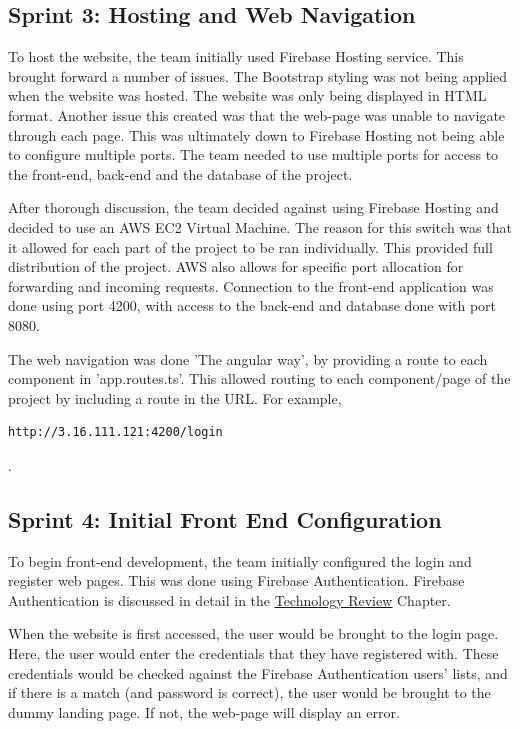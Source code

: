 \subsection{Sprint 3: Hosting and Web Navigation}
\label{sec:MethodologySprint3}
To host the website, the team initially used Firebase Hosting service. This brought forward a number of issues. The Bootstrap styling was not being applied when the website was hosted. The website was only being displayed in HTML format. Another issue this created was that the web-page was unable to navigate through each page. This was ultimately down to Firebase Hosting not being able to configure multiple ports. The team needed to use multiple ports for access to the front-end, back-end and the database of the project.

\bigskip

After thorough discussion, the team decided against using Firebase Hosting and decided to use an AWS EC2 Virtual Machine. The reason for this switch was that it allowed for each part of the project to be ran individually. This provided full distribution of the project. AWS also allows for specific port allocation for forwarding and incoming requests. Connection to the front-end application was done using port 4200, with access to the back-end and database done with port 8080.

\bigskip

The web navigation was done 'The angular way', by providing a route to each component in 'app.routes.ts'. This allowed routing to each component/page of the project by including a route in the URL. For example, \begin{verbatim}http://3.16.111.121:4200/login\end{verbatim}.
\subsection{Sprint 4: Initial Front End Configuration}
\label{sec:MethodologySprint4}
To begin front-end development, the team initially configured the login and register web pages. This was done using Firebase Authentication. Firebase Authentication is discussed in detail in the \hyperref[sec:TechnologyReview]{\underline{Technology Review}} Chapter.

\bigskip

When the website is first accessed, the user would be brought to the login page. Here, the user would enter the credentials that they have registered with. These credentials would be checked against the Firebase Authentication users' lists, and if there is a match (and password is correct), the user would be brought to the dummy landing page. If not, the web-page will display an error.

